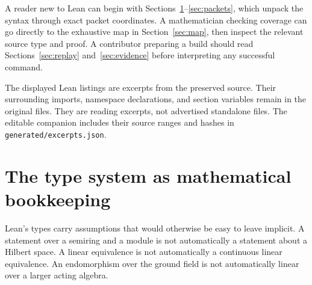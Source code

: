 \documentclass[11pt,a4paper]{article}
\newcommand{\code}[1]{\nolinkurl{#1}}
\begin{document}
A reader new to Lean can begin with Sections~\ref{sec:types}--\ref{sec:packets}, which unpack the syntax through exact packet coordinates. A mathematician checking coverage can go directly to the exhaustive map in Section~\ref{sec:map}, then inspect the relevant source type and proof. A contributor preparing a build should read Sections~\ref{sec:replay} and~\ref{sec:evidence} before interpreting any successful command.

The displayed Lean listings are excerpts from the preserved source. Their surrounding imports, namespace declarations, and section variables remain in the original files. They are reading excerpts, not advertised standalone files. The editable companion includes their source ranges and hashes in \code{generated/excerpts.json}.

\section{The type system as mathematical bookkeeping}\label{sec:types}

Lean's types carry assumptions that would otherwise be easy to leave implicit. A statement over a semiring and a module is not automatically a statement about a Hilbert space. A linear equivalence is not automatically a continuous linear equivalence. An endomorphism over the ground field is not automatically linear over a larger acting algebra.
\end{document}
